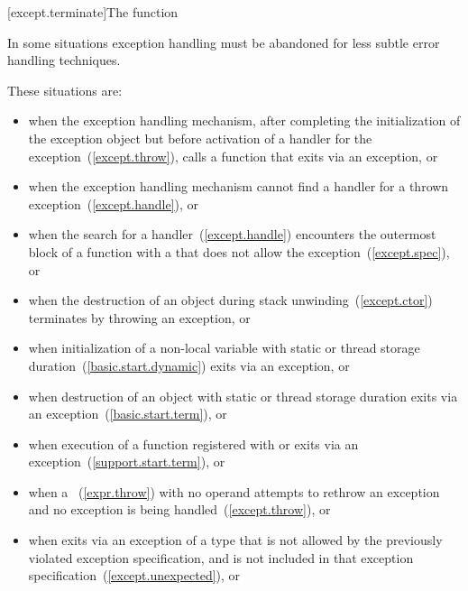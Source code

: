 [except.terminate]{The  function}

\pnum
{}%
In some situations exception handling must be abandoned
for less subtle error handling techniques. \begin{note} These situations are:

%
\begin{itemize}
\item%
when the exception handling mechanism, after completing
the initialization of the exception object
but before
activation of a handler for the exception~(\ref{except.throw}),
calls a function that exits
via an exception, or

\item%
when the exception handling mechanism cannot find a handler for a thrown exception~(\ref{except.handle}), or

\item when the search for a handler~(\ref{except.handle}) encounters the
outermost block of a function with a 
that does not allow the exception~(\ref{except.spec}), or

\item%
when the destruction of an object during stack unwinding~(\ref{except.ctor})
terminates by throwing an exception, or

\item%
when initialization of a non-local
variable with static or thread storage duration~(\ref{basic.start.dynamic})
exits via an exception, or

\item%
when destruction of an object with static or thread storage duration exits
via an exception~(\ref{basic.start.term}), or

\item%
when execution of a function registered with
 or 
exits via an exception~(\ref{support.start.term}), or

\item%
when a
~(\ref{expr.throw})
with no operand attempts to rethrow an exception and no exception is being
handled~(\ref{except.throw}), or

\item%
when
exits via an exception
of a type
that is not allowed by the previously violated
exception specification,
and
is not included in that
exception specification~(\ref{except.unexpected}), or


\end{itemize}
\end{note}
